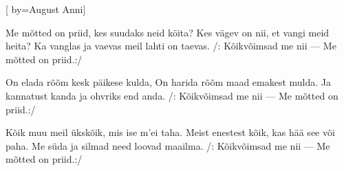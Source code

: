 [
	by={August Anni}]

\beginverse
Me mõtted on priid,
kes suudaks neid köita?
Kes vägev on nii,
et vangi meid heita?
Ka vanglas ja vaevas
meil lahti on taevas.
/: Kõikvõimsad me nii —
Me mõtted on priid.:/ 
\endverse

\beginverse
On elada rõõm
kesk päikese kulda,
On harida rõõm
maad emakest mulda.
Ja kannatust kanda
ja ohvriks end anda.
/: Kõikvõimsad me nii —
Me mõtted on priid.:/ 
\endverse

\beginverse
Kõik muu meil ükskõik,
mis ise m'ei taha.
Meist enestest kõik,
kas hää see või paha.
Me süda ja silmad
need loovad maailma.
/: Kõikvõimsad me nii —
Me mõtted on priid.:/ 
\endverse
\endsong
